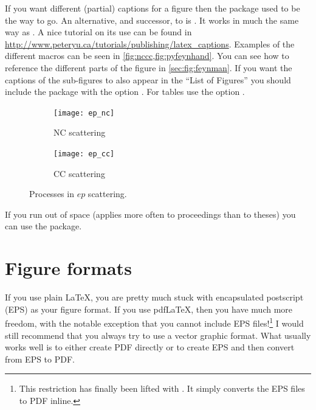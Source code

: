 If you want different (partial) captions for a figure then the
 package used to be the way to go. 
An alternative, and successor, to  is .
It works in much the same way as .
A nice tutorial on its use can be found in
\url{http://www.peteryu.ca/tutorials/publishing/latex_captions}.
Examples of the different  macros can be seen in \cref{fig:nccc,fig:pyfeynhand}.
You can see how to reference
the different parts of the figure in \cref{sec:fig:feynman}.
If you want the captions of the sub-figures to also appear in the
\enquote{List of Figures} you should include the package with the
option . For tables use the option .

\begin{figure}[htbp]
\begin{tcblisting}{}
\centering
\begin{subfigure}[b]{0.5\figwidth}
  \texttt{[image: ep\_nc]}
  \caption{NC scattering}\label{fig:nccc-nc}
\end{subfigure}
\qquad
\begin{subfigure}[b]{0.5\figwidth}
  \texttt{[image: ep\_cc]}
  \caption{CC scattering}\label{fig:nccc-cc}
\end{subfigure}
\caption{Processes in $ep$ scattering.}%
\label{fig:nccc}
\end{tcblisting}
\end{figure}

If you run out of space (applies more often to proceedings than to theses)
you can use the  package.


\section{Figure formats}%
\label{sec:fig:formats}

If you use plain \LaTeX, you are pretty much stuck with encapsulated
postscript (EPS) as your figure format. If you use pdf\LaTeX, then you
have much more freedom, with the notable exception that you cannot
include EPS files!\footnote{%
This restriction has finally been lifted with .
It simply converts the EPS files to PDF inline.}
I would still recommend that you always try to use
a vector graphic format. What usually works well is to either create
PDF directly or to create EPS and then convert from EPS to PDF\@.

